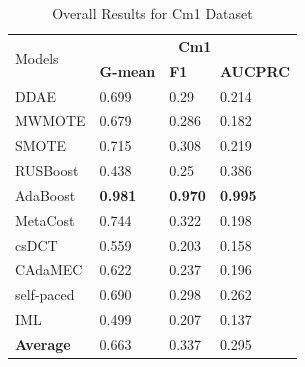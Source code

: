 \begin{table}[H]
    \centering
    \renewcommand\arraystretch{0.85} 
    \begin{tabular}{|p{}<{\centering}|p{}<{\centering}|p{}<{\centering}|p{}<{\centering}|}
    \hline
    \multirow{2}{*}{Models} & \multicolumn{3}{c|}{\textbf{Cm1}}    \\ \cline{2-4} 
                             & \textbf{G-mean} & \textbf{F1} & \textbf{AUCPRC} \\ \hline
    DDAE                     &0.699	&0.29	&0.214             \\ \hline
    MWMOTE                   &0.679	&0.286	&0.182             \\ \hline
    SMOTE                    &0.715	&0.308	&0.219               \\ \hline
    RUSBoost                 &0.438	&0.25	&0.386            \\ \hline
    AdaBoost                 & \textbf{0.981}	&\textbf{0.970}	&\textbf{0.995}             \\ \hline
    MetaCost                 & 0.744	&0.322	&0.198             \\ \hline
    csDCT                    &0.559	&0.203	&0.158              \\ \hline
    CAdaMEC                  &0.622	&0.237	&0.196             \\ \hline
    self-paced               &0.690	&0.298	&0.262              \\ \hline
    IML                      &0.499	&0.207	&0.137            \\ \hline\hline
    \textbf{Average}         &0.663	&0.337	&0.295              \\ \hline
    \end{tabular}
    \vspace{-8pt}
    \caption{Overall Results for Cm1 Dataset}
    \label{tab19}
\end{table}
\vspace{-23.5pt}
